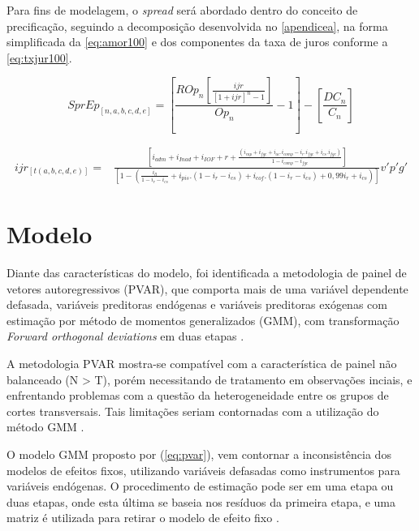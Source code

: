 \documentclass[
  12pt,
  12pt,
  openright,
  oneside,
  a4paper,
  chapter=TITLE,
  section=TITLE,
  subsection=TITLE,
  subsubsection=TITLE,
  portugues,
  sumario=tradicional]{abntex2}
\begin{document}
Para fins de modelagem, o \emph{spread} será abordado dentro do conceito de precificação, seguindo a decomposição desenvolvida no \autoref{apendicea}, na forma simplificada da \autoref{eq:amor100} e dos componentes da taxa de juros conforme a \autoref{eq:txjur100}.

\begin{equation}\label{eq:amor100}
SprEp_{[n,a,b,c,d,e]} = \left[ \frac{ROp_{n}[\frac{   ijr_{}  }{  [1 + ijr_{}]^n -1  }]}{Op_{n}} -1 \right] - \left[ \frac{DC_{n}}{C_{n}} \right]
\end{equation}

\begin{equation}\label{eq:txjur100}
\begin{aligned}
ijr_{[t(a,b,c,d,e)]} = & \frac{[i_{adm} + i_{Inad} + i_{IOF} + r +  \frac{(i_{cap} + i_{fgc} + i_{ac}.i_{comp} - i_{r}.i_{fgc}+ i_{cs}.i_{fgc})}{1 - i_{comp} - i_{fgc}}]}
{[1 - (\frac{i_{ll}}{1 - i_{r} - i_{cs}} + i_{pis}.(1 - i_{r} - i_{cs}) + i_{cof}.(1 - i_{r} - i_{cs}) + 0,99i_{r} + i_{cs})]}v'p'g'
\end{aligned}
\end{equation}

\section{Modelo}

Diante das características do modelo, foi identificada a metodologia de painel de vetores autoregressivos (PVAR), que comporta mais de uma variável dependente defasada, variáveis preditoras endógenas e variáveis preditoras exógenas com estimação por método de momentos generalizados (GMM), com transformação \emph{Forward orthogonal deviations} em duas etapas \cite{sigmund:2008}.

A metodologia PVAR mostra-se compatível com a característica de painel não balanceado (N \textgreater{} T), porém necessitando de tratamento em observações inciais, e enfrentando problemas com a questão da heterogeneidade entre os grupos de cortes transversais. Tais limitações seriam contornadas com a utilização do método GMM \cite{holtz-eakin:1988}.

O modelo GMM proposto por \textcite{arellanobond:1991} (\autoref{eq:pvar}), vem contornar a inconsistência dos modelos de efeitos fixos, utilizando variáveis defasadas como instrumentos para variáveis endógenas. O procedimento de estimação pode ser em uma etapa ou duas etapas, onde esta última se baseia nos resíduos da primeira etapa, e uma matriz é utilizada para retirar o modelo de efeito fixo \cite{sigmund:2008}.
\end{document}
